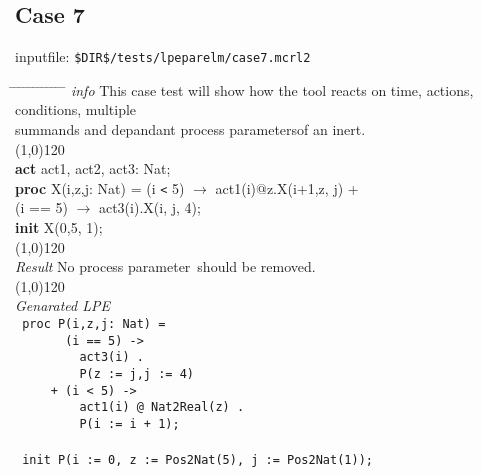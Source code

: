 \documentclass[a4paper,10pt]{article}
\theoremstyle{plain}
\theoremstyle{definition}
\newcommand{\ti}{\textit}
\newcommand{\tb}{\textbf}
\newcommand{\pp}{process parameter}
\newcommand{\pps}{process parameters}
\newcommand{\tabw}{\hspace*{15.mm} \= \hspace*{20.mm} \= \hspace*{5.mm} \= \hspace*{5.mm} \= \hspace*{5.mm} \= \hspace*{5.mm}  \= \hspace*{5.mm}  \= \hspace*{5.mm}  \= \hspace*{5.mm} \= \hspace*{5.mm} \= \hspace*{5.mm}  \= \hspace*{5.mm}  \= \hspace*{5.mm}\kill}
\begin{document}
\subsection*{Case 7}
inputfile: \verb"$DIR$/tests/lpeparelm/case7.mcrl2"
\begin{tabbing}
\tabw
\ti{info} \> This case test will show how the tool reacts on time, actions, conditions, multiple \\
	\> summands and depandant \pps of an inert.\\
\line(1,0){120}\\
\tb{act}  \> act1, act2, act3: Nat;\\
\tb{proc} \> X(i,z,j: Nat) \>    = \>  (i \verb"<"  5) $\rightarrow$ act1(i)$@$z.X(i+1,z, j) +\\
          \>               \>  \> (i == 5) $\rightarrow$ act3(i).X(i, j, 4); \\
\tb{init} X(0,5, 1);\\
\line(1,0){120}\\
\ti{Result} \> No \pp\ should be removed.\\ 
\line(1,0){120}\\
\ti{Genarated LPE} \\
\>  \verb" proc P(i,z,j: Nat) ="\\
\>  \verb"       (i == 5) ->"\\
\>  \verb"         act3(i) ."\\
\>  \verb"         P(z := j,j := 4)"\\
\>  \verb"     + (i < 5) ->"\\
\>  \verb"         act1(i) @ Nat2Real(z) ."\\
\>  \verb"         P(i := i + 1);"\\
\\
\>  \verb" init P(i := 0, z := Pos2Nat(5), j := Pos2Nat(1));"\\
\end{tabbing}
\end{document}
